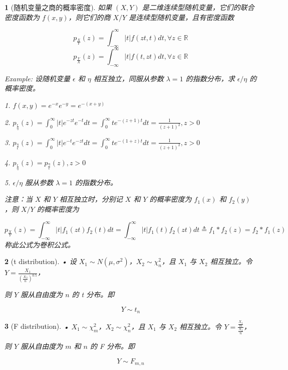 \documentclass[UTF8]{report}
\theoremstyle{MyLineTheoremStyle} %
\theoremstyle{MyBlockTheoremStyle} %
\theoremstyle{MySubsubsectionStyle} %
\newtheorem{definition}{}
\begin{document}
\begin{definition}[随机变量之商的概率密度]
    如果 $(X, Y)$ 是二维连续型随机变量，它们的联合密度函数为 $f(x, y)$，则它们的商 $X/Y$ 是连续型随机变量，且有密度函数\par
    \[
    p_{\frac{X}{Y}}(z) = \int_{-\infty}^{\infty} |t| f(zt, t) dt, \forall z \in \mathbb{R}
    \]
    \[
    p_{\frac{Y}{X}}(z) = \int_{-\infty}^{\infty} |t| f(t, zt) dt, \forall z \in \mathbb{R}
    \]\par
    Example: 设随机变量 $\epsilon$ 和 $\eta$ 相互独立，同服从参数 $\lambda=1$ 的指数分布，求 $\epsilon/\eta$ 的概率密度。\par
    1. $f(x, y) = e^{-x} e^{-y} = e^{-(x+y)}$\par
    2. $p_{\frac{\epsilon}{\eta}}(z) = \int_{0}^{\infty} |t| e^{-zt} e^{-t} dt = \int_{0}^{\infty} t e^{-(z+1)t} dt = \frac{1}{(z+1)^2}, z > 0$\par
    3. $p_{\frac{\eta}{\epsilon}}(z) = \int_{0}^{\infty} |t| e^{-t} e^{-zt} dt = \int_{0}^{\infty} t e^{-(1+z)t} dt = \frac{1}{(z+1)^2}, z > 0$\par
    4. $p_{\frac{\epsilon}{\eta}}(z) = p_{\frac{\eta}{\epsilon}}(z), z > 0$\par
    5. $\epsilon/\eta$ 服从参数 $\lambda=1$ 的指数分布。\par
    注意：当 $X$ 和 $Y$ 相互独立时，分别记 $X$ 和 $Y$ 的概率密度为 $f_1(x)$ 和 $f_2(y)$，则 $X/Y$ 的概率密度为\par
    \[
    p_{\frac{X}{Y}}(z) = \int_{-\infty}^{\infty} |t| f_1(zt) f_2(t) dt = \int_{-\infty}^{\infty} |t| f_1(t) f_2(zt) dt \triangleq f_1 * f_2(z) = f_2 * f_1(z)
    \]
    称此公式为卷积公式。\par
\end{definition}

\begin{definition}[t distribution]
    • 设 $X_1 \sim N(\mu, \sigma^2)$，$X_2 \sim \chi^2_n$，且 $X_1$ 与 $X_2$ 相互独立。令 $Y = \frac{X_1}{\left(\frac{X_2}{n}\right)^{0.5}}$，\par
    则 $Y$ 服从自由度为 $n$ 的 t 分布。即\par
    \[
    Y \sim t_n
    \]
\end{definition}

\begin{definition}[F distribution]
    • $X_1 \sim \chi^2_m$，$X_2 \sim \chi^2_n$，且 $X_1$ 与 $X_2$ 相互独立。令 $Y = \frac{\frac{X_1}{m}}{\frac{X_2}{n}}$，\par
    则 $Y$ 服从自由度为 $m$ 和 $n$ 的 F 分布。即\par
    \[
    Y \sim F_{m, n}
    \]
\end{definition}
\end{document}
